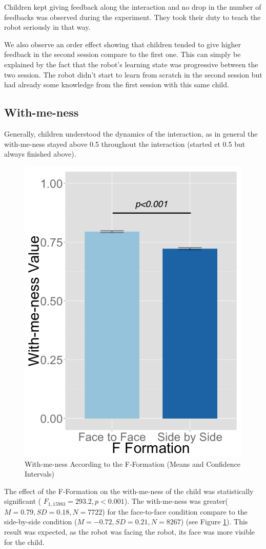 \documentclass[letterpaper, 10 pt, conference]{ieeeconf}  %
\begin{document}
Children kept giving feedback along the interaction and no drop in the number of feedbacks was observed during the experiment.
They took their duty to teach the robot seriously in that way.

We also observe an order effect showing that children tended to give higher feedback in the second session compare to the first one.
This can simply be explained by the fact that the robot's learning state was progressive between the two session. 
The robot didn't start to learn from scratch in the second session but had already some knowledge from the first session with this same child. 





\subsection{With-me-ness}
Generally, children understood the dynamics of the interaction, as in general the with-me-ness stayed above 0.5 throughout the interaction (started et 0.5 but always finished above).
\begin{figure}	
\centering
\includegraphics[width=0.6\linewidth]{figures/plots/withmeness_fformation_ci}
\caption{With-me-ness According to the F-Formation (Means and Confidence Intervals)}
\label{fig:withmeness_fformation_ci}
\end{figure}
 The effect of the F-Formation on the with-me-ness of the child was statistically significant ( $F_{1,15983}= 293.2, p<0.001$). The with-me-ness was greater($M=0.79, SD=0.18, N=7722$) for the face-to-face condition compare to the side-by-side condition ($M=-0.72, SD=0.21, N=8267$) (see Figure \ref{fig:withmeness_fformation_ci}).
 This result was expected, as the robot was facing the robot, its face was more visible for the child.
\end{document}
